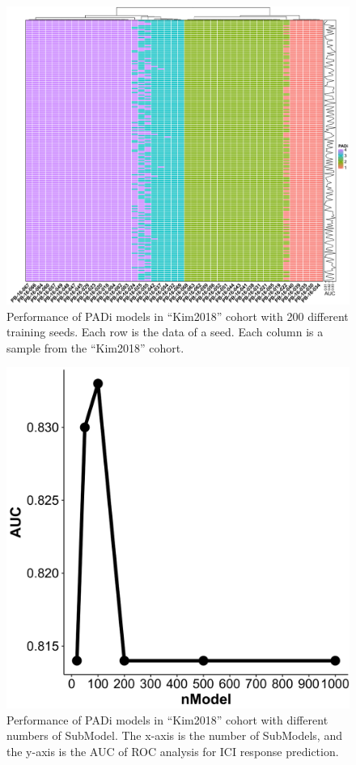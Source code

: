 \documentclass[
  12pt,
]{book}
\begin{document}
\begin{figure}

{\centering \includegraphics[width=0.9\linewidth]{./fig/model-no-01} 

}

\caption{Performance of PADi models in “Kim2018” cohort with 200 different training seeds. Each row is the data of a seed. Each column is a sample from the “Kim2018” cohort.}\label{fig:mn01}
\end{figure}

\begin{figure}

{\centering \includegraphics[width=0.9\linewidth]{./fig/model-no-02} 

}

\caption{Performance of PADi models in “Kim2018” cohort with different numbers of SubModel. The x-axis is the number of SubModels, and the y-axis is the AUC of ROC analysis for ICI response prediction.}\label{fig:mn02}
\end{figure}
\end{document}
